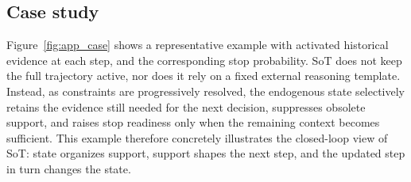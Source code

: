     \vspace{-1.0mm}
    \subsection{Case study}
    \label{sec:case_study}
    \vspace{-0.5mm}
    
    Figure~\ref{fig:app_case} shows a representative example with activated historical evidence at each step, and the corresponding stop probability.
    SoT does not keep the full trajectory active, nor does it rely on a fixed external reasoning template.
    Instead, as constraints are progressively resolved, the endogenous state selectively retains the evidence still needed for the next decision, suppresses obsolete support, and raises stop readiness only when the remaining context becomes sufficient.
    This example therefore concretely illustrates the closed-loop view of SoT: state organizes support, support shapes the next step, and the updated step in turn changes the state.